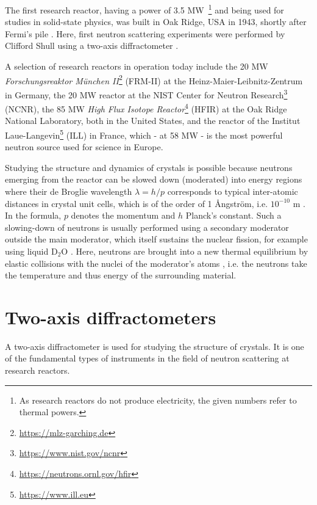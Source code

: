 The first research reactor, having a power of 3.5 MW~\footnote{As research reactors do not produce electricity, the given numbers refer to thermal powers.} and being used for studies in solid-state physics, was built in Oak Ridge, USA in 1943, shortly after Fermi's pile \cite[p. 3]{Jacrot2021}. 
Here, first neutron scattering experiments were performed by Clifford Shull using a two-axis diffractometer \cite[pp. 3, 37]{Jacrot2021}.

A selection of research reactors in operation today include the 20 MW \textit{Forschungsreaktor M\"unchen II}\footnote{\url{https://mlz-garching.de}} (FRM-II) at the Heinz-Maier-Leibnitz-Zentrum in Germany, the 20 MW reactor at the NIST Center for Neutron Research\footnote{\url{https://www.nist.gov/ncnr}} (NCNR), the 85 MW \textit{High Flux Isotope Reactor}\footnote{\url{https://neutrons.ornl.gov/hfir}} (HFIR) at the Oak Ridge National Laboratory, both in the United States, and the reactor of the Institut Laue-Langevin\footnote{\url{https://www.ill.eu}} (ILL) in France, which - at 58 MW - is the most powerful neutron source used for science in Europe.

Studying the structure and dynamics of crystals is possible because neutrons emerging from the reactor can be slowed down (moderated) into energy regions where their de Broglie wavelength $\lambda = h/p$ corresponds to typical inter-atomic distances in crystal unit cells, which is of the order of 1 \AA{}ngstr\"om, i.e. $10^{-10}$ m \cite[pp.1,3]{Squires2012}. In the formula, $p$ denotes the momentum and $h$ Planck's constant. Such a slowing-down of neutrons is usually performed using a secondary moderator outside the main moderator, which itself sustains the nuclear fission, for example using liquid $\mathrm{D_2O}$ \cite[p. 82]{Jacrot2021}. Here, neutrons are brought into a new thermal equilibrium by elastic collisions with the nuclei of the moderator's atoms \cite[p. 30]{Stacey2007}, i.e. the neutrons take the temperature and thus energy of the surrounding material.



\section{Two-axis diffractometers \label{sec:diff}}

A two-axis diffractometer is used for studying the structure of crystals. It is one of the fundamental types of instruments in the field of neutron scattering at research reactors.



